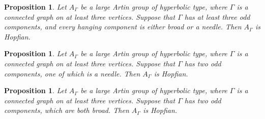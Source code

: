 \documentclass[10pt,a4paper]{amsart}
\theoremstyle{plain}
\newtheorem{prop}[thm]{Proposition}
\begin{document}
\begin{prop}\label{prop:3+_odd}
    Let $A_\Gamma$ be a large Artin group of hyperbolic type, where $\Gamma$ is a connected graph on at least three vertices. Suppose that $\Gamma$ has at least three odd components, and every hanging component is either broad or a needle. Then $A_\Gamma$ is Hopfian.
\end{prop}

\begin{prop}\label{prop:2_odd_needle}
    Let $A_\Gamma$ be a large Artin group of hyperbolic type, where $\Gamma$ is a connected graph on at least three vertices. Suppose that $\Gamma$ has two odd components, one of which is a needle. Then $A_\Gamma$ is Hopfian.
\end{prop}

\begin{prop}\label{prop:2_odd_broad}
    Let $A_\Gamma$ be a large Artin group of hyperbolic type, where $\Gamma$ is a connected graph on at least three vertices. Suppose that $\Gamma$ has two odd components, which are both broad. Then $A_\Gamma$ is Hopfian.
\end{prop}
\end{document}
